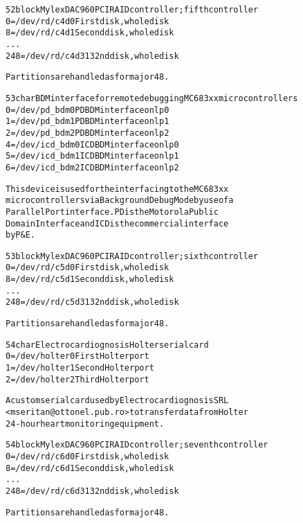 \documentclass[a4paper,8pt,english]{sphinxmanual}
\begin{document}
\begin{alltt}
  52 block      Mylex DAC960 PCI RAID controller; fifth controller
                  0 = /dev/rd/c4d0      First disk, whole disk
                  8 = /dev/rd/c4d1      Second disk, whole disk
                    ...
                248 = /dev/rd/c4d31     32nd disk, whole disk

                Partitions are handled as for major 48.

  53 char       BDM interface for remote debugging MC683xx microcontrollers
                  0 = /dev/pd\_bdm0      PD BDM interface on lp0
                  1 = /dev/pd\_bdm1      PD BDM interface on lp1
                  2 = /dev/pd\_bdm2      PD BDM interface on lp2
                  4 = /dev/icd\_bdm0     ICD BDM interface on lp0
                  5 = /dev/icd\_bdm1     ICD BDM interface on lp1
                  6 = /dev/icd\_bdm2     ICD BDM interface on lp2

                This device is used for the interfacing to the MC683xx
                microcontrollers via Background Debug Mode by use of a
                Parallel Port interface. PD is the Motorola Public
                Domain Interface and ICD is the commercial interface
                by P\&E.

  53 block      Mylex DAC960 PCI RAID controller; sixth controller
                  0 = /dev/rd/c5d0      First disk, whole disk
                  8 = /dev/rd/c5d1      Second disk, whole disk
                    ...
                248 = /dev/rd/c5d31     32nd disk, whole disk

                Partitions are handled as for major 48.

  54 char       Electrocardiognosis Holter serial card
                  0 = /dev/holter0      First Holter port
                  1 = /dev/holter1      Second Holter port
                  2 = /dev/holter2      Third Holter port

                A custom serial card used by Electrocardiognosis SRL
                \textless{}mseritan@ottonel.pub.ro\textgreater{} to transfer data from Holter
                24-hour heart monitoring equipment.

  54 block      Mylex DAC960 PCI RAID controller; seventh controller
                  0 = /dev/rd/c6d0      First disk, whole disk
                  8 = /dev/rd/c6d1      Second disk, whole disk
                    ...
                248 = /dev/rd/c6d31     32nd disk, whole disk

                Partitions are handled as for major 48.


\end{alltt}
\end{document}
